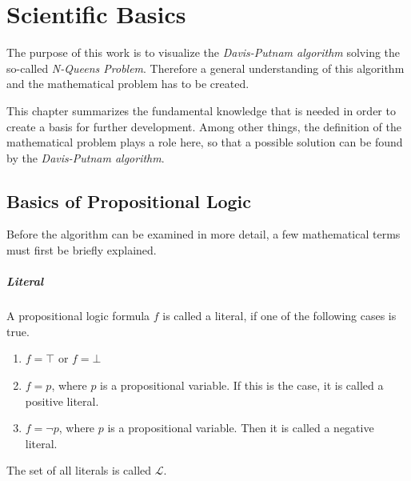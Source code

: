 

\chapter{Scientific Basics}
\label{ch:sciBasics}
The purpose of this work is to visualize the \textit{Davis-Putnam algorithm} solving the so-called \textit{N-Queens Problem}. Therefore a general understanding of this algorithm and the mathematical problem has to be created.

This chapter summarizes the fundamental knowledge that is needed in order to create a basis for further development. Among other things, the definition of the mathematical problem plays a role here, so that a possible solution can be found by the \textit{Davis-Putnam algorithm}.

\section{Basics of Propositional Logic}
\label{sec:sciProLogic}
Before the algorithm can be examined in more detail, a few mathematical terms must first be briefly explained.

\paragraph{Literal}
A propositional logic formula $f$ is called a literal, if one of the following cases is true.
\begin{enumerate}
  \item $f = \top$ or $f = \bot$
  \item $f = p$, where $p$ is a propositional variable. If this is the case, it is called a positive literal.
  \item $f = \neg p$, where $p$ is a propositional variable. Then it is called a negative literal.
\end{enumerate}
The set of all literals is called $\mathcal{L}$.

